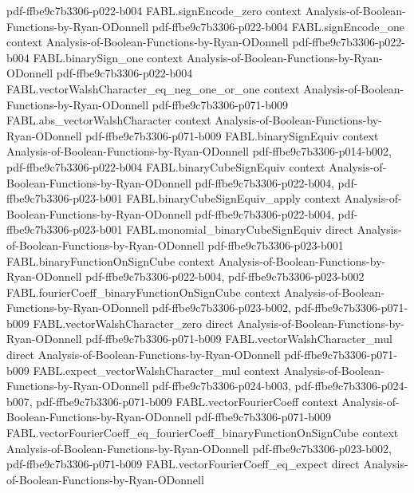 \begin{theorem}
  {pdf-ffbe9c7b3306-p022-b004}
\proofstep
  {FABL.signEncode_zero}
  {context}
  {Analysis-of-Boolean-Functions-by-Ryan-ODonnell}
  {pdf-ffbe9c7b3306-p022-b004}
\proofstep
  {FABL.signEncode_one}
  {context}
  {Analysis-of-Boolean-Functions-by-Ryan-ODonnell}
  {pdf-ffbe9c7b3306-p022-b004}
\proofstep
  {FABL.binarySign_one}
  {context}
  {Analysis-of-Boolean-Functions-by-Ryan-ODonnell}
  {pdf-ffbe9c7b3306-p022-b004}
\proofstep
  {FABL.vectorWalshCharacter_eq_neg_one_or_one}
  {context}
  {Analysis-of-Boolean-Functions-by-Ryan-ODonnell}
  {pdf-ffbe9c7b3306-p071-b009}
\proofstep
  {FABL.abs_vectorWalshCharacter}
  {context}
  {Analysis-of-Boolean-Functions-by-Ryan-ODonnell}
  {pdf-ffbe9c7b3306-p071-b009}
\proofstep
  {FABL.binarySignEquiv}
  {context}
  {Analysis-of-Boolean-Functions-by-Ryan-ODonnell}
  {pdf-ffbe9c7b3306-p014-b002,
    pdf-ffbe9c7b3306-p022-b004}
\proofstep
  {FABL.binaryCubeSignEquiv}
  {context}
  {Analysis-of-Boolean-Functions-by-Ryan-ODonnell}
  {pdf-ffbe9c7b3306-p022-b004,
    pdf-ffbe9c7b3306-p023-b001}
\proofstep
  {FABL.binaryCubeSignEquiv_apply}
  {context}
  {Analysis-of-Boolean-Functions-by-Ryan-ODonnell}
  {pdf-ffbe9c7b3306-p022-b004,
    pdf-ffbe9c7b3306-p023-b001}
\proofstep
  {FABL.monomial_binaryCubeSignEquiv}
  {direct}
  {Analysis-of-Boolean-Functions-by-Ryan-ODonnell}
  {pdf-ffbe9c7b3306-p023-b001}
\proofstep
  {FABL.binaryFunctionOnSignCube}
  {context}
  {Analysis-of-Boolean-Functions-by-Ryan-ODonnell}
  {pdf-ffbe9c7b3306-p022-b004,
    pdf-ffbe9c7b3306-p023-b002}
\proofstep
  {FABL.fourierCoeff_binaryFunctionOnSignCube}
  {context}
  {Analysis-of-Boolean-Functions-by-Ryan-ODonnell}
  {pdf-ffbe9c7b3306-p023-b002,
    pdf-ffbe9c7b3306-p071-b009}
\proofstep
  {FABL.vectorWalshCharacter_zero}
  {direct}
  {Analysis-of-Boolean-Functions-by-Ryan-ODonnell}
  {pdf-ffbe9c7b3306-p071-b009}
\proofstep
  {FABL.vectorWalshCharacter_mul}
  {direct}
  {Analysis-of-Boolean-Functions-by-Ryan-ODonnell}
  {pdf-ffbe9c7b3306-p071-b009}
\proofstep
  {FABL.expect_vectorWalshCharacter_mul}
  {context}
  {Analysis-of-Boolean-Functions-by-Ryan-ODonnell}
  {pdf-ffbe9c7b3306-p024-b003,
    pdf-ffbe9c7b3306-p024-b007,
    pdf-ffbe9c7b3306-p071-b009}
\proofstep
  {FABL.vectorFourierCoeff}
  {context}
  {Analysis-of-Boolean-Functions-by-Ryan-ODonnell}
  {pdf-ffbe9c7b3306-p071-b009}
\proofstep
  {FABL.vectorFourierCoeff_eq_fourierCoeff_binaryFunctionOnSignCube}
  {context}
  {Analysis-of-Boolean-Functions-by-Ryan-ODonnell}
  {pdf-ffbe9c7b3306-p023-b002,
    pdf-ffbe9c7b3306-p071-b009}
\proofstep
  {FABL.vectorFourierCoeff_eq_expect}
  {direct}
  {Analysis-of-Boolean-Functions-by-Ryan-ODonnell}

\end{theorem}
